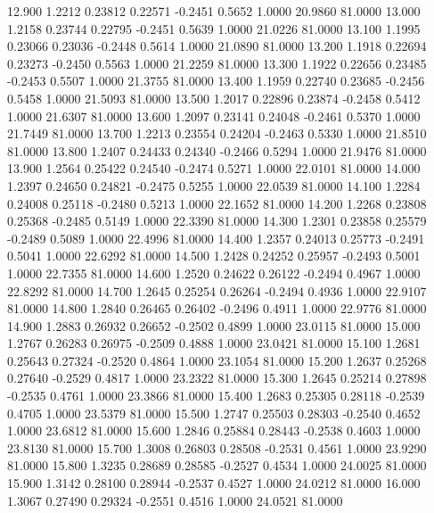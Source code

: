   12.900   1.2212   0.23812   0.22571  -0.2451   0.5652   1.0000  20.9860  81.0000
  13.000   1.2158   0.23744   0.22795  -0.2451   0.5639   1.0000  21.0226  81.0000
  13.100   1.1995   0.23066   0.23036  -0.2448   0.5614   1.0000  21.0890  81.0000
  13.200   1.1918   0.22694   0.23273  -0.2450   0.5563   1.0000  21.2259  81.0000
  13.300   1.1922   0.22656   0.23485  -0.2453   0.5507   1.0000  21.3755  81.0000
  13.400   1.1959   0.22740   0.23685  -0.2456   0.5458   1.0000  21.5093  81.0000
  13.500   1.2017   0.22896   0.23874  -0.2458   0.5412   1.0000  21.6307  81.0000
  13.600   1.2097   0.23141   0.24048  -0.2461   0.5370   1.0000  21.7449  81.0000
  13.700   1.2213   0.23554   0.24204  -0.2463   0.5330   1.0000  21.8510  81.0000
  13.800   1.2407   0.24433   0.24340  -0.2466   0.5294   1.0000  21.9476  81.0000
  13.900   1.2564   0.25422   0.24540  -0.2474   0.5271   1.0000  22.0101  81.0000
  14.000   1.2397   0.24650   0.24821  -0.2475   0.5255   1.0000  22.0539  81.0000
  14.100   1.2284   0.24008   0.25118  -0.2480   0.5213   1.0000  22.1652  81.0000
  14.200   1.2268   0.23808   0.25368  -0.2485   0.5149   1.0000  22.3390  81.0000
  14.300   1.2301   0.23858   0.25579  -0.2489   0.5089   1.0000  22.4996  81.0000
  14.400   1.2357   0.24013   0.25773  -0.2491   0.5041   1.0000  22.6292  81.0000
  14.500   1.2428   0.24252   0.25957  -0.2493   0.5001   1.0000  22.7355  81.0000
  14.600   1.2520   0.24622   0.26122  -0.2494   0.4967   1.0000  22.8292  81.0000
  14.700   1.2645   0.25254   0.26264  -0.2494   0.4936   1.0000  22.9107  81.0000
  14.800   1.2840   0.26465   0.26402  -0.2496   0.4911   1.0000  22.9776  81.0000
  14.900   1.2883   0.26932   0.26652  -0.2502   0.4899   1.0000  23.0115  81.0000
  15.000   1.2767   0.26283   0.26975  -0.2509   0.4888   1.0000  23.0421  81.0000
  15.100   1.2681   0.25643   0.27324  -0.2520   0.4864   1.0000  23.1054  81.0000
  15.200   1.2637   0.25268   0.27640  -0.2529   0.4817   1.0000  23.2322  81.0000
  15.300   1.2645   0.25214   0.27898  -0.2535   0.4761   1.0000  23.3866  81.0000
  15.400   1.2683   0.25305   0.28118  -0.2539   0.4705   1.0000  23.5379  81.0000
  15.500   1.2747   0.25503   0.28303  -0.2540   0.4652   1.0000  23.6812  81.0000
  15.600   1.2846   0.25884   0.28443  -0.2538   0.4603   1.0000  23.8130  81.0000
  15.700   1.3008   0.26803   0.28508  -0.2531   0.4561   1.0000  23.9290  81.0000
  15.800   1.3235   0.28689   0.28585  -0.2527   0.4534   1.0000  24.0025  81.0000
  15.900   1.3142   0.28100   0.28944  -0.2537   0.4527   1.0000  24.0212  81.0000
  16.000   1.3067   0.27490   0.29324  -0.2551   0.4516   1.0000  24.0521  81.0000
